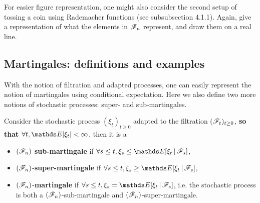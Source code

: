 \begin{exercise}
For easier figure representation, one might also consider the second setup of tossing a coin using Rademacher functions (see subsubsection 4.1.1). Again, give a representation of what the elements in $\mathcal{F}_n$ represent, and draw them on a real line. 
\end{exercise}


\subsection{Martingales: definitions and examples}
With the notion of filtration and adapted processes, one can easily represent the notion of martingales using conditional expectation. Here we also define two more notions of stochastic processes: super- and sub-martingales.

\begin{definition}
Consider the stochastic process $(\xi_t)_{t\geq 0}$ adapted to the filtration $(\mathcal{F}_t)_{t\geq 0}$, \textbf{so that $\forall t, \E|\xi_t|<\infty$}, then it is a 
\begin{itemize}
    \item $(\mathcal{F}_n)$-\textbf{sub-martingale} if $\forall s \leq t, \xi_s \leq \E[\xi_{t} \,|\, \F_s]$, 
    \item $(\mathcal{F}_n)$-\textbf{super-martingale} if $\forall s \leq t, \xi_s \geq \E[\xi_{t} \,|\, \F_s]$,
    \item $(\mathcal{F}_n)$-\textbf{martingale} if $\forall s \leq t, \xi_s = \E[\xi_{t} \,|\, \F_s]$, i.e. the stochastic process is both a $(\mathcal{F}_n)$-sub-martingale and $(\mathcal{F}_n)$-super-martingale.
\end{itemize}
\end{definition}

